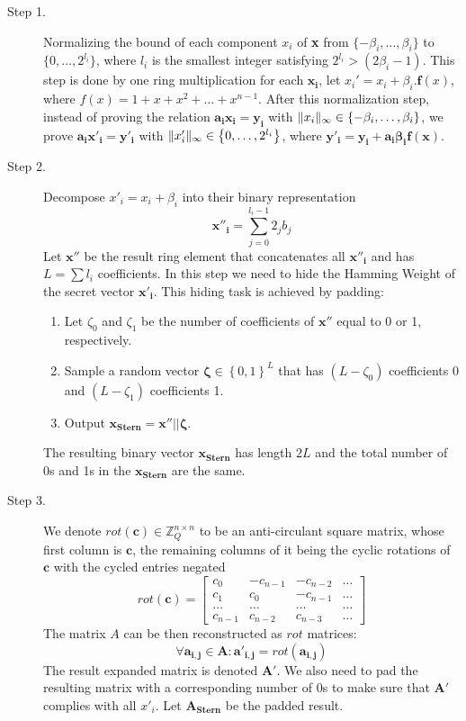 \begin{description}
\item [Step 1.] Normalizing the bound of each component $x_i$ of \textbf{x} from $\{-\beta_i,\dots,\beta_i\}$ to
  $\{0,\dots,2^{l_i}\}$, where $l_i$ is the smallest integer satisfying $2^{l_i} > (2\beta_i -1)$. This step is done by
  one ring multiplication for each $\mathbf{x_i}$, let $x_i' = x_i + \beta_i.\mathbf{f}(x)$, where
  $f(x) = 1 + x + x^2 + \dots + x^{n-1}$. After this normalization step, instead of proving the relation
  $\mathbf{a_i x_i = y_i}$ with $\Vert x_i \Vert_{\infty} \in \left\{ -\beta_i, \dots, \beta_i \right\}$, we prove
  $\mathbf{a_i x'_i = y'_i}$ with $\Vert  x'_i  \Vert_{\infty} \in \left\{ 0,\dots,2^{l_i} \right\}$, where
  $\mathbf{y'_i = y_i + a_i\beta_i f(x)}$.

\item [Step 2.] Decompose $x'_i = x_i + \beta_i$ into their binary representation
  \[
    \mathbf{x''_i} = \sum_{j = 0}^{l_i -1}{2_j b_j}
  \]
  Let $\mathbf{x''}$ be the result ring element that concatenates all $\mathbf{x''_i}$ and has $L = \sum{l_i}$
  coefficients. In this step we need to hide the Hamming Weight of the secret vector $\mathbf{x'_i}$. This hiding task
  is achieved by padding:
  \begin{enumerate}
  \item Let $\zeta_0$ and $\zeta_1$ be the number of coefficients of $\mathbf{x''}$ equal to 0 or 1, respectively.
  \item Sample a random vector $\mathbf{\zeta} \in \left\{ 0,1 \right\}^{L}$ that has $(L - \zeta_0)$ coefficients 0 and
    $(L - \zeta_1)$ coefficients 1.
  \item Output $\mathbf{x_{Stern}} = \mathbf{x''} || \mathbf{\zeta}$.
  \end{enumerate}
  The resulting binary vector $\mathbf{x_{Stern}}$ has length $2L$ and the total number of 0s and 1s in the
  $\mathbf{x_{Stern}}$ are the same.

\item [Step 3.] We denote $ rot({\textbf{c}}) \in \mathbb{Z}_Q^{n\times n}$ to be an anti-circulant square matrix, whose
  first column is $\mathbf{c}$, the remaining columns of it being the cyclic rotations of $\mathbf{c}$ with the cycled entries
  negated
  \[
    rot({\mathbf{c}})=
    \begin{bmatrix}
      c_0 & -c_{n-1} & -c_{n-2} & \dots\\
      c_1 & c_0 & -c_{n-1} & \dots\\
      \dots & \dots & \dots & \dots\\
      c_{n-1} & c_{n-2} & c_{n-3} & \dots
    \end{bmatrix}
  \]
  The matrix $A$ can be then reconstructed as $rot$ matrices:
  \[
    \forall \mathbf{a_{i,j}} \in \mathbf{A}: \mathbf{a'_{i,j}} =
    rot(\mathbf{a_{i,j}})
  \]
  The result expanded matrix is denoted $\mathbf{A'}$. We also need to pad the resulting matrix with a corresponding
  number of 0s to make sure that $\mathbf{A'}$ complies with all $x'_i$. Let $\mathbf{A_{Stern}}$ be the padded result.


\end{description}
